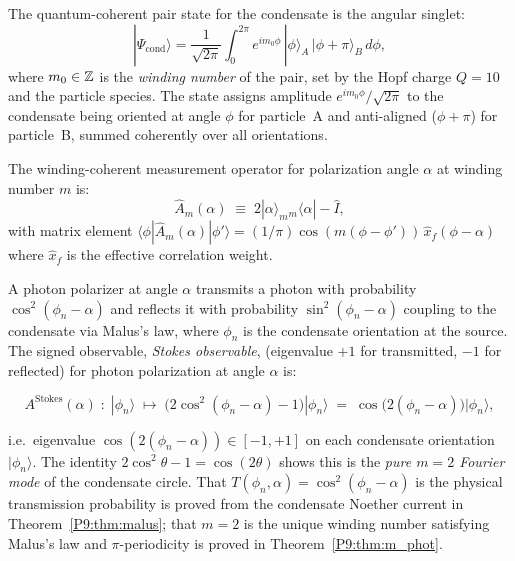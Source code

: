 \begin{definition}
\label{P9:def:quantum_singlet}
The quantum-coherent pair state for the condensate is the angular singlet:
\begin{equation}
  |\Psi_\mathrm{cond}\rangle
  = \frac{1}{\sqrt{2\pi}}
  \int_0^{2\pi} e^{im_0\phi}\,|\phi\rangle_A\,|\phi+\pi\rangle_B\,d\phi,
  \label{P9:eq:qsinglet}
\end{equation}
where $m_0\in\mathbb{Z}$ is the \emph{winding number} of the pair, set by the Hopf
charge $Q=10$ and the particle species.
The state assigns amplitude $e^{im_0\phi}/\sqrt{2\pi}$ to the condensate
being oriented at angle $\phi$ for particle~A and anti-aligned ($\phi+\pi$) for
particle~B, summed coherently over all orientations.
\end{definition}

\begin{definition}
\label{P9:def:winding_measurement}
The winding-coherent measurement operator for polarization angle $\alpha$
at winding number $m$ is:
\begin{equation}
  \hat{A}_m(\alpha)
  \;\equiv\; 2|\alpha\rangle_m{}_m\langle\alpha| - \hat{I},
  \label{P9:eq:A_winding}
\end{equation}
with matrix element
$\langle\phi|\hat{A}_m(\alpha)|\phi'\rangle
= (1/\pi)\cos(m(\phi-\phi'))\,\hat{x}_f(\phi-\alpha)$
where $\hat{x}_f$ is the effective correlation weight.
\end{definition}

\begin{definition}
\label{P9:def:stokes}
A photon polarizer at angle $\alpha$ transmits a photon with probability
$\cos^2(\phi_n-\alpha)$ and reflects it with probability $\sin^2(\phi_n-\alpha)$ coupling to the condensate via Malus's law, where $\phi_n$ is the condensate orientation at the source. The signed observable, \emph{Stokes observable}, (eigenvalue $+1$ for transmitted, $-1$ for reflected) for photon polarization at angle $\alpha$ is:

\begin{equation}
  A^\mathrm{Stokes}(\alpha) \;:\; |\phi_n\rangle
  \;\longmapsto\; \bigl(2\cos^2(\phi_n-\alpha)-1\bigr)|\phi_n\rangle
  \;=\; \cos\bigl(2(\phi_n-\alpha)\bigr)|\phi_n\rangle,
  \label{P9:eq:stokes_op}
\end{equation}

i.e.\ eigenvalue $\cos(2(\phi_n-\alpha))\in[-1,+1]$ on each condensate
orientation $|\phi_n\rangle$.
The identity $2\cos^2\theta-1=\cos(2\theta)$ shows this is the
\emph{pure $m=2$ Fourier mode} of the condensate circle.
That $T(\phi_n,\alpha)=\cos^2(\phi_n-\alpha)$ is the physical transmission
probability is proved from the condensate Noether current in
Theorem~\ref{P9:thm:malus}; that $m=2$ is the unique winding number
satisfying Malus's law and $\pi$-periodicity is proved in
Theorem~\ref{P9:thm:m_phot}.
\end{definition}

